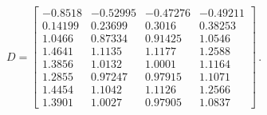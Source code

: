 \vfill
\begin{equation}
    D = \begin{bmatrix}
        -0.8518 & -0.52995 & -0.47276 & -0.49211 \\
        0.14199 & 0.23699 & 0.3016 & 0.38253 \\
        1.0466 & 0.87334 & 0.91425 & 1.0546 \\
        1.4641 & 1.1135 & 1.1177 & 1.2588 \\
        1.3856 & 1.0132 & 1.0001 & 1.1164 \\
        1.2855 & 0.97247 & 0.97915 & 1.1071 \\
        1.4454 & 1.1042 & 1.1126 & 1.2566 \\
        1.3901 & 1.0027 & 0.97905 & 1.0837
    \end{bmatrix}\,.\nonumber
\end{equation}
\vfill
\vfill
\vfill
